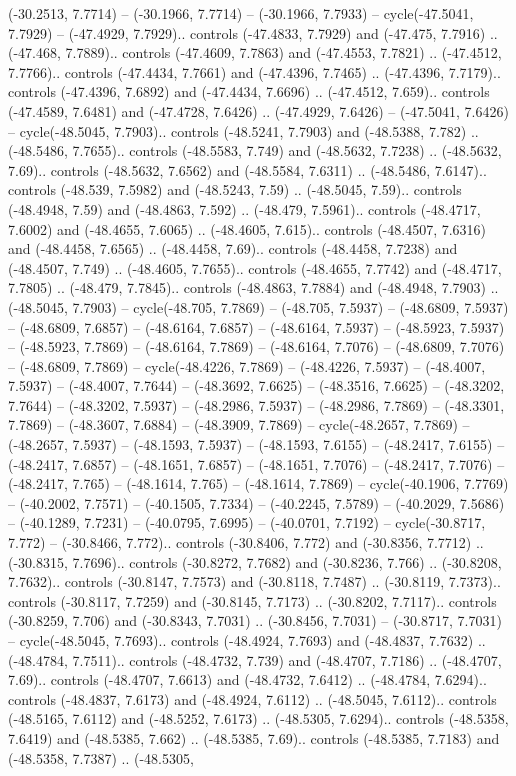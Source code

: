 \begin{scope}[shift={(2.5552, 9.9912)}]
\begin{scope}[shift={(48.1654, -14.8546)}]
(-30.2513, 7.7714) -- (-30.1966, 7.7714) -- (-30.1966, 7.7933) -- cycle(-47.5041, 7.7929) -- (-47.4929, 7.7929).. controls (-47.4833, 7.7929) and (-47.475, 7.7916) .. (-47.468, 7.7889).. controls (-47.4609, 7.7863) and (-47.4553, 7.7821) .. (-47.4512, 7.7766).. controls (-47.4434, 7.7661) and (-47.4396, 7.7465) .. (-47.4396, 7.7179).. controls (-47.4396, 7.6892) and (-47.4434, 7.6696) .. (-47.4512, 7.659).. controls (-47.4589, 7.6481) and (-47.4728, 7.6426) .. (-47.4929, 7.6426) -- (-47.5041, 7.6426) -- cycle(-48.5045, 7.7903).. controls (-48.5241, 7.7903) and (-48.5388, 7.782) .. (-48.5486, 7.7655).. controls (-48.5583, 7.749) and (-48.5632, 7.7238) .. (-48.5632, 7.69).. controls (-48.5632, 7.6562) and (-48.5584, 7.6311) .. (-48.5486, 7.6147).. controls (-48.539, 7.5982) and (-48.5243, 7.59) .. (-48.5045, 7.59).. controls (-48.4948, 7.59) and (-48.4863, 7.592) .. (-48.479, 7.5961).. controls (-48.4717, 7.6002) and (-48.4655, 7.6065) .. (-48.4605, 7.615).. controls (-48.4507, 7.6316) and (-48.4458, 7.6565) .. (-48.4458, 7.69).. controls (-48.4458, 7.7238) and (-48.4507, 7.749) .. (-48.4605, 7.7655).. controls (-48.4655, 7.7742) and (-48.4717, 7.7805) .. (-48.479, 7.7845).. controls (-48.4863, 7.7884) and (-48.4948, 7.7903) .. (-48.5045, 7.7903) -- cycle(-48.705, 7.7869) -- (-48.705, 7.5937) -- (-48.6809, 7.5937) -- (-48.6809, 7.6857) -- (-48.6164, 7.6857) -- (-48.6164, 7.5937) -- (-48.5923, 7.5937) -- (-48.5923, 7.7869) -- (-48.6164, 7.7869) -- (-48.6164, 7.7076) -- (-48.6809, 7.7076) -- (-48.6809, 7.7869) -- cycle(-48.4226, 7.7869) -- (-48.4226, 7.5937) -- (-48.4007, 7.5937) -- (-48.4007, 7.7644) -- (-48.3692, 7.6625) -- (-48.3516, 7.6625) -- (-48.3202, 7.7644) -- (-48.3202, 7.5937) -- (-48.2986, 7.5937) -- (-48.2986, 7.7869) -- (-48.3301, 7.7869) -- (-48.3607, 7.6884) -- (-48.3909, 7.7869) -- cycle(-48.2657, 7.7869) -- (-48.2657, 7.5937) -- (-48.1593, 7.5937) -- (-48.1593, 7.6155) -- (-48.2417, 7.6155) -- (-48.2417, 7.6857) -- (-48.1651, 7.6857) -- (-48.1651, 7.7076) -- (-48.2417, 7.7076) -- (-48.2417, 7.765) -- (-48.1614, 7.765) -- (-48.1614, 7.7869) -- cycle(-40.1906, 7.7769) -- (-40.2002, 7.7571) -- (-40.1505, 7.7334) -- (-40.2245, 7.5789) -- (-40.2029, 7.5686) -- (-40.1289, 7.7231) -- (-40.0795, 7.6995) -- (-40.0701, 7.7192) -- cycle(-30.8717, 7.772) -- (-30.8466, 7.772).. controls (-30.8406, 7.772) and (-30.8356, 7.7712) .. (-30.8315, 7.7696).. controls (-30.8272, 7.7682) and (-30.8236, 7.766) .. (-30.8208, 7.7632).. controls (-30.8147, 7.7573) and (-30.8118, 7.7487) .. (-30.8119, 7.7373).. controls (-30.8117, 7.7259) and (-30.8145, 7.7173) .. (-30.8202, 7.7117).. controls (-30.8259, 7.706) and (-30.8343, 7.7031) .. (-30.8456, 7.7031) -- (-30.8717, 7.7031) -- cycle(-48.5045, 7.7693).. controls (-48.4924, 7.7693) and (-48.4837, 7.7632) .. (-48.4784, 7.7511).. controls (-48.4732, 7.739) and (-48.4707, 7.7186) .. (-48.4707, 7.69).. controls (-48.4707, 7.6613) and (-48.4732, 7.6412) .. (-48.4784, 7.6294).. controls (-48.4837, 7.6173) and (-48.4924, 7.6112) .. (-48.5045, 7.6112).. controls (-48.5165, 7.6112) and (-48.5252, 7.6173) .. (-48.5305, 7.6294).. controls (-48.5358, 7.6419) and (-48.5385, 7.662) .. (-48.5385, 7.69).. controls (-48.5385, 7.7183) and (-48.5358, 7.7387) .. (-48.5305, 
\end{scope}
\end{scope}
